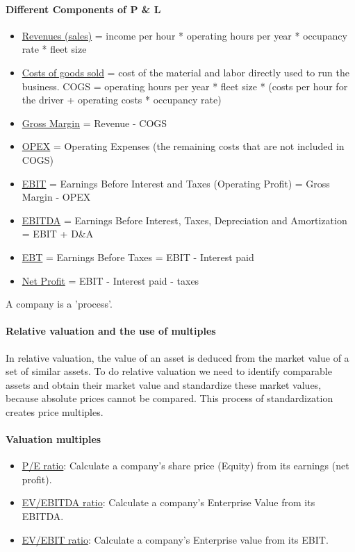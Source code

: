 \paragraph{Different Components of P \& L}
\begin{itemize}
    \item \underline{Revenues (sales)} = income per hour * operating hours per
        year * occupancy rate * fleet size
    \item \underline{Costs of goods sold} = cost of the material and labor directly
        used to run the business. COGS = operating hours per year * fleet size *
        (costs per hour for the driver + operating costs * occupancy rate)
    \item \underline{Gross Margin} = Revenue - COGS
    \item \underline{OPEX} = Operating Expenses (the remaining costs that are not 
        included in COGS)
    \item \underline{EBIT} = Earnings Before Interest and Taxes (Operating Profit)
        = Gross Margin - OPEX
    \item \underline{EBITDA} = Earnings Before Interest, Taxes, Depreciation and
        Amortization = EBIT + D\&A
    \item \underline{EBT} = Earnings Before Taxes = EBIT - Interest paid
    \item \underline{Net Profit} = EBIT - Interest paid - taxes
\end{itemize}

A company is a 'process'.

\paragraph{Relative valuation and the use of multiples}
In relative valuation, the value of an asset is deduced from the market value
of a set of similar assets. To do relative valuation we need to identify comparable
assets and obtain their market value and standardize these market values, because
absolute prices cannot be compared. This process of standardization creates
price multiples.

\paragraph{Valuation multiples}
\begin{itemize}
    \item \underline{P/E ratio}: Calculate a company's share price (Equity)
        from its earnings (net profit).
    \item \underline{EV/EBITDA ratio}: Calculate a company's Enterprise Value
        from its EBITDA.
    \item \underline{EV/EBIT ratio}: Calculate a company's Enterprise value
        from its EBIT.
\end{itemize}

